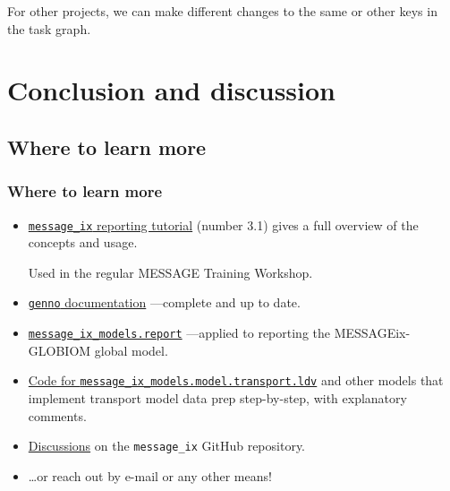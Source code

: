 \documentclass[12pt,aspectratio=169]{beamer}
\renewcommand{\mod}[1]{\texttt{#1}}
\begin{document}
\begin{frame}[allowframebreaks]
For other projects, we can make different changes to the same or other keys in the task graph.
\end{frame}

\section{Conclusion and discussion}

\subsection{Where to learn more}

\begin{frame}
\frametitle{Where to learn more}

\begin{itemize}
  \item \href{https://docs.messageix.org/en/latest/tutorials.html#westeros-electrified}{\mod{message_ix} reporting tutorial} (number 3.1)
    gives a full overview of the concepts and usage.

    Used in the regular MESSAGE Training Workshop.
  \item \href{https://genno.readthedocs.io/en/latest/}{\mod{genno} documentation} —complete and up to date.
  \item \href{https://docs.messageix.org/projects/models/en/latest/api/report/index.html}{\mod{message_ix_models.report}}
    —applied to reporting the MESSAGEix-GLOBIOM global model.
  \item \href{https://github.com/iiasa/message-ix-models/blob/main/message_ix_models/model/transport/ldv.py}{Code for \mod{message_ix_models.model.transport.ldv}}
    and other models that implement transport model data prep step-by-step, with explanatory comments.
  \item \href{https://github.com/iiasa/message_ix/discussions}{Discussions} on the \mod{message_ix} GitHub repository.
  \item …or reach out by e-mail or any other means!
\end{itemize}
\end{frame}

\makefinalslide
\end{document}
